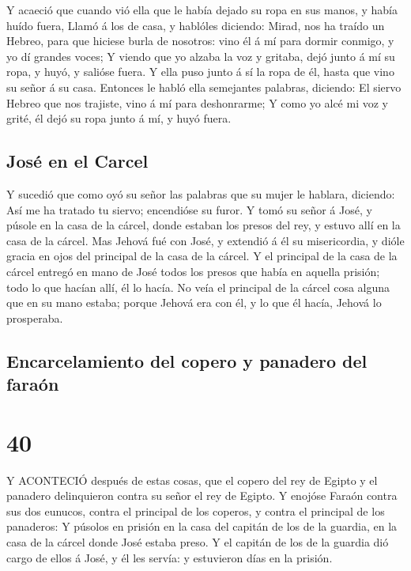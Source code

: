  Y acaeció que cuando vió ella que le había dejado su ropa
en sus manos, y había huído fuera,  Llamó á los de casa, y
hablóles diciendo: Mirad, nos ha traído un Hebreo, para que hiciese
burla de nosotros: vino él á mí para dormir conmigo, y yo dí grandes
voces;  Y viendo que yo alzaba la voz y gritaba, dejó junto
á mí su ropa, y huyó, y salióse fuera.  Y ella puso junto á
sí la ropa de él, hasta que vino su señor á su casa. 
Entonces le habló ella semejantes palabras, diciendo: El siervo Hebreo
que nos trajiste, vino á mí para deshonrarme;  Y como yo
alcé mi voz y grité, él dejó su ropa junto á mí, y huyó fuera.

\hypertarget{josuxe9-en-el-carcel}{%
\subsection{José en el Carcel}\label{josuxe9-en-el-carcel}}

 Y sucedió que como oyó su señor las palabras que su mujer
le hablara, diciendo: Así me ha tratado tu siervo; encendióse su furor.
 Y tomó su señor á José, y púsole en la casa de la cárcel,
donde estaban los presos del rey, y estuvo allí en la casa de la cárcel.
 Mas Jehová fué con José, y extendió á él su misericordia,
y dióle gracia en ojos del principal de la casa de la cárcel.
 Y el principal de la casa de la cárcel entregó en mano de
José todos los presos que había en aquella prisión; todo lo que hacían
allí, él lo hacía.  No veía el principal de la cárcel cosa
alguna que en su mano estaba; porque Jehová era con él, y lo que él
hacía, Jehová lo prosperaba.

\hypertarget{encarcelamiento-del-copero-y-panadero-del-farauxf3n}{%
\subsection{Encarcelamiento del copero y panadero del
faraón}\label{encarcelamiento-del-copero-y-panadero-del-farauxf3n}}

\hypertarget{section-39}{%
\section{40}\label{section-39}}

 Y ACONTECIÓ después de estas cosas, que el copero del rey
de Egipto y el panadero delinquieron contra su señor el rey de Egipto.
 Y enojóse Faraón contra sus dos eunucos, contra el
principal de los coperos, y contra el principal de los panaderos:
 Y púsolos en prisión en la casa del capitán de los de la
guardia, en la casa de la cárcel donde José estaba preso.  Y
el capitán de los de la guardia dió cargo de ellos á José, y él les
servía: y estuvieron días en la prisión.

